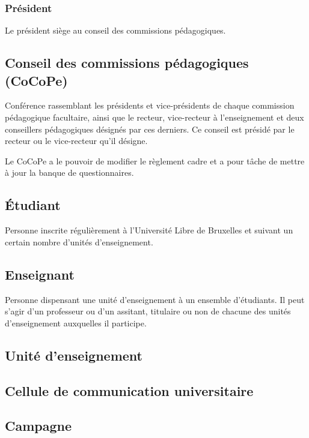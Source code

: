 \documentclass[a4paper,11pt]{report}
\begin{document}
\subsubsection{Président}
Le président siège au conseil des commissions pédagogiques.

\subsection{Conseil des commissions pédagogiques (CoCoPe)}
Conférence rassemblant les présidents et vice-présidents de chaque commission pédagogique facultaire, ainsi que le recteur, vice-recteur à l'enseignement et deux conseillers pédagogiques désignés par ces derniers.
Ce conseil est présidé par le recteur ou le vice-recteur qu'il désigne.

Le CoCoPe a le pouvoir de modifier le règlement cadre et a pour tâche de mettre à jour la banque de questionnaires.


\subsection{Étudiant}
Personne inscrite régulièrement à l'Université Libre de Bruxelles et suivant un certain nombre d'unités d'enseignement.

\subsection{Enseignant}
Personne dispensant une unité d'enseignement à un ensemble d'étudiants.
Il peut s'agir d'un professeur ou d'un assitant, titulaire ou non de chacune des unités d'enseignement auxquelles il participe.

\subsection{Unité d'enseignement}

\subsection{Cellule de communication universitaire}

\subsection{Campagne}
\end{document}
